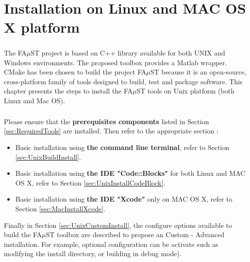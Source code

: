\chapter{Installation on Linux and MAC OS X platform}\label{sec:InstallUnix}

\paragraph{}The FA$\mu$ST project is based on C++ library available for both UNIX and Windows environments. The proposed toolbox provides a Matlab wrapper. CMake has been chosen to build the project FA$\mu$ST because it is an open-source, cross-platform family of tools designed to build, test and package software. This chapter presents the steps to install the FA$\mu$ST tools on Unix platform (both Linux and Mac OS). 

\paragraph{}Please ensure that the \textbf{prerequisites components} listed in Section \ref{sec:RequiredTools} are installed. Then refer to the appropriate section : 
\begin{itemize}
\item Basic installation using \textbf{the command line terminal}, refer to Section \ref{sec:UnixBuildInstall}.
\item Basic installation using \textbf{the IDE "Code::Blocks"} for both Linux and MAC OS X, refer to Section \ref{sec:UnixInstallCodeBlock}. 
\item Basic installation using \textbf{the IDE "Xcode"} only on MAC OS X, refer to Section \ref{sec:MacInstallXcode}. 
\end{itemize}

Finally in Section \ref{sec:UnixCustomInstall}, the configure options available to build the FA$\mu$ST toolbox are described to propose an Custom - Advanced installation. For example, optional configuration can be activate such as modifying the install directory, or building in debug mode).  

